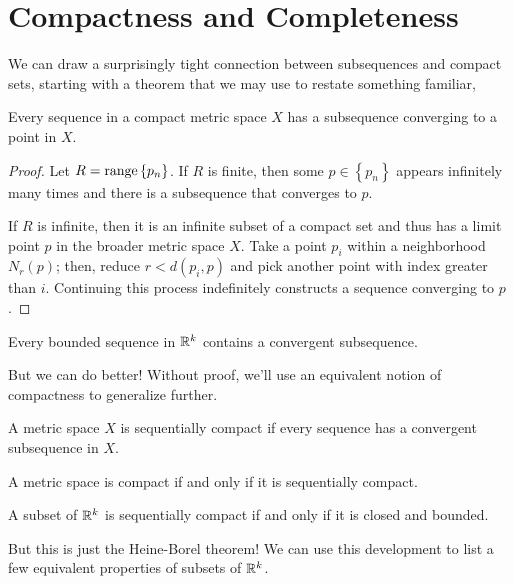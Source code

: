 \documentclass[../m131main.tex]{subfiles}
\begin{document}
\section{Compactness and Completeness}
We can draw a surprisingly tight connection between subsequences and compact sets, starting with a theorem that we may use to restate something familiar,

\begin{theorem}[]
    Every sequence in a compact metric space $X$ has a subsequence converging to a point in $X$.
\end{theorem}

\begin{proof}
    Let $R = \textrm{range} \left\{ p_n \right\}$.
    If $R$ is finite, then some $p \in \left\{ p_n \right\}$ appears infinitely many times and there is a subsequence that converges to $p$.

    If $R$ is infinite, then it is an infinite subset of a compact set and thus has a limit point $p$ in the broader metric space $X$.
    Take a point $p_i$ within a neighborhood $N_r(p)$; then, reduce $r < d(p_i, p)$ and pick another point with index greater than $i$.
    Continuing this process indefinitely constructs a sequence converging to $p$.
\end{proof}

\begin{corollary}
    Every bounded sequence in $\mathbb{R}^k$ contains a convergent subsequence.
\end{corollary}

But we can do better!
Without proof, we'll use an equivalent notion of compactness to generalize further.

\begin{definition}
    A metric space $X$ is sequentially compact if every sequence has a convergent subsequence in $X$.
\end{definition}

\begin{theorem}[]
    A metric space is compact if and only if it is sequentially compact.
\end{theorem}

\begin{corollary}
    A subset of $\mathbb{R}^k$ is sequentially compact if and only if it is closed and bounded.
\end{corollary}

But this is just the Heine-Borel theorem!
We can use this development to list a few equivalent properties of subsets of $\mathbb{R}^k$.
\end{document}
